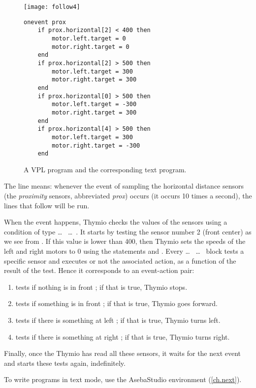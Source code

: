 \begin{figure}
\texttt{[image: follow4]}
\hfill
\begin{minipage}[b]{0.6\textwidth}
\footnotesize
\begin{lstlisting}
onevent prox
	if prox.horizontal[2] < 400 then
		motor.left.target = 0
		motor.right.target = 0
	end
	if prox.horizontal[2] > 500 then
		motor.left.target = 300
		motor.right.target = 300
	end
	if prox.horizontal[0] > 500 then
		motor.left.target = -300
		motor.right.target = 300
	end
	if prox.horizontal[4] > 500 then
		motor.left.target = 300
		motor.right.target = -300
	end
\end{lstlisting}
\end{minipage}
\caption{A VPL program and the corresponding text program.}
\label{fig.textcode}
\end{figure}

The line  means: whenever the event of sampling the
horizontal distance sensors (the \emph{proximity} sensors, abbreviated \emph{prox}) occurs (it
occurs 10 times a second), the lines that follow will be run.

When the event happens, Thymio checks the values of the sensors using a condition of type  \ldots \  \ldots \ .
It starts by testing the sensor number 2 (front center) as we see from .
If this value is lower than 400, then Thymio sets the speeds of the left and right motors to 0 using the statements  and .
Every  \ldots \  \ldots \  block tests a specific sensor and executes or not the associated action, as a function of the result of the test.
Hence it corresponds to an event-action pair:
\begin{enumerate}[start=0,noitemsep,nosep]
	\item tests if nothing is in front ; if that is true, Thymio stops.
	\item tests if something is in front ; if that is true, Thymio goes forward.
	\item tests if there is something at left ; if that is true, Thymio turns left.
	\item tests if there is something at right ; if that is true, Thymio turns right.
\end{enumerate}
Finally, once the Thymio has read all these sensors, it waits for the next event  and starts these tests again, indefinitely.

To write programs in text mode, use the AsebaStudio environment (\cref{ch.next}).

